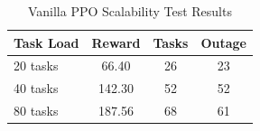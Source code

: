 \begin{table}[t]
\centering
\caption{Vanilla PPO Scalability Test Results}
\label{tab:vanilla_ppo_scalability}
\begin{tabular}{lccc}
\hline
\textbf{Task Load} & \textbf{Reward} & \textbf{Tasks} & \textbf{Outage} \\
\hline
20 tasks & 66.40 & 26 & 23 \\
40 tasks & 142.30 & 52 & 52 \\
80 tasks & 187.56 & 68 & 61 \\
\hline
\end{tabular}
\end{table}